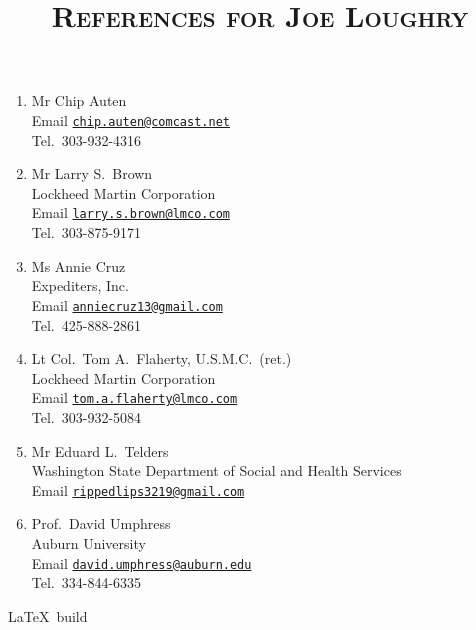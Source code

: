 \documentclass[12pt,letterpaper]{article}
\date{}
\title{\textsc{References for Joe Loughry}}
\author{}
\begin{document}
\maketitle
\thispagestyle{empty}

\begin{enumerate}

	\item Mr Chip Auten \\
		Email \href{mailto:chip.auten@comcast.net}{\nolinkurl{chip.auten@comcast.net}} \\
		Tel.\ 303-932-4316

	\item Mr Larry S.~Brown \\
		Lockheed Martin Corporation \\
		Email \href{mailto:larry.s.brown@lmco.com}{\nolinkurl{larry.s.brown@lmco.com}} \\
		Tel.\ 303-875-9171

	\item Ms Annie Cruz \\
		Expediters, Inc. \\
		Email \href{mailto:anniecruz13@gmail.com}{\nolinkurl{anniecruz13@gmail.com}} \\
		Tel.\ 425-888-2861

	\item Lt Col.\ Tom A.~Flaherty, U.S.M.C.~(ret.) \\
		Lockheed Martin Corporation \\
		Email \href{mailto:tom.a.flaherty@lmco.com}{\nolinkurl{tom.a.flaherty@lmco.com}} \\
		Tel.\ 303-932-5084

	\item Mr Eduard L.~Telders \\
		Washington State Department of Social and Health Services \\
		Email \href{mailto:rippedlips3219@gmail.com}{\nolinkurl{rippedlips3219@gmail.com}}

	\item Prof.\ David Umphress \\
		Auburn University \\
		Email \href{mailto:david.umphress@auburn.edu}{\nolinkurl{david.umphress@auburn.edu}} \\
		Tel.\ 334-844-6335 

\end{enumerate}

\vfill
{\tiny \LaTeX\ build }
\end{document}
